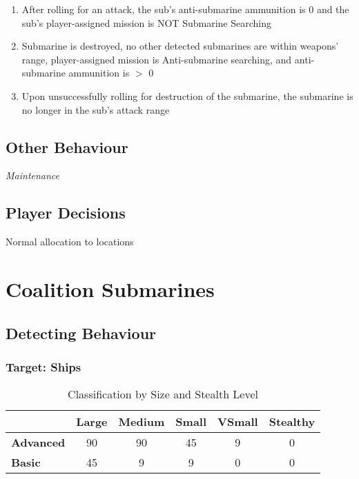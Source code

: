 \documentclass{article}
\begin{document}
\begin{itemize}
\begin{enumerate}[label=\arabic*)]
                    [Sub's mission becomes Transit to Base]
                    \item After rolling for an attack, the sub's anti-submarine ammunition is 0 and the sub's player-assigned mission is NOT Submarine Searching \par
                    [Ship resumes player-assigned mission]
                    \item Submarine is destroyed, no other detected submarines are within weapons' range, player-assigned mission is Anti-submarine searching, and anti-submarine ammunition is $>$ 0\par
                    [Sub's mission becomes Antisubmarine searching]
                    \item Upon unsuccessfully rolling for destruction of the submarine, the submarine is no longer in the sub's attack range\par
                    [Ship resumes player-assigned mission]
                \end{enumerate}
        \end{itemize}
    
\subsection{Other Behaviour}
        \noindent \textit{Maintenance}
            
\subsection{Player Decisions}
        Normal allocation to locations

\section{Coalition Submarines}

\subsection{Detecting Behaviour}

    \subsubsection{Target: Ships}
        \begin{table}[h!]
            \centering
            \begin{tabular}{|l|c|c|c|c|c|}
            \hline
            & \textbf{Large} & \textbf{Medium} & \textbf{Small} & \textbf{VSmall} & \textbf{Stealthy} \\
            \hline
            \textbf{Advanced} & 90 & 90 & 45 & 9 & 0 \\
            \hline
            \textbf{Basic} & 45 & 9 & 9 & 0 & 0 \\
            \hline
            \end{tabular}
            \caption{Classification by Size and Stealth Level}
            \label{table:size_stealth_classification}
        \end{table}
\end{document}
